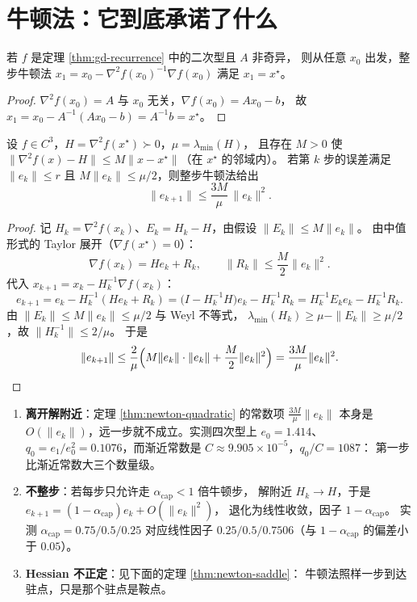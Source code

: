 \section{牛顿法：它到底承诺了什么}

\begin{theorem}[二次型上一步到驻点]
\label{thm:newton-one-step}
若 $f$ 是定理 \ref{thm:gd-recurrence} 中的二次型且 $A$ 非奇异，
则从任意 $x_0$ 出发，整步牛顿法 $x_1=x_0-\nabla^2f(x_0)^{-1}\nabla f(x_0)$
满足 $x_1=x^\star$。
\end{theorem}

\begin{proof}
$\nabla^2f(x_0)=A$ 与 $x_0$ 无关，$\nabla f(x_0)=Ax_0-b$，
故 $x_1=x_0-A^{-1}(Ax_0-b)=A^{-1}b=x^\star$。
\end{proof}

\begin{theorem}[局部二次收敛及其常数]
\label{thm:newton-quadratic}
设 $f\in C^3$，$H=\nabla^2f(x^\star)\succ0$，$\mu=\lambda_{\min}(H)$，
且存在 $M>0$ 使 $\|\nabla^2f(x)-H\|\le M\|x-x^\star\|$（在 $x^\star$ 的邻域内）。
若第 $k$ 步的误差满足 $\|e_k\|\le r$ 且 $M\|e_k\|\le\mu/2$，则整步牛顿法给出
\[
  \|e_{k+1}\|\le\frac{3M}{\mu}\,\|e_k\|^2 .
\]
\end{theorem}

\begin{proof}
记 $H_k=\nabla^2f(x_k)$、$E_k=H_k-H$，由假设 $\|E_k\|\le M\|e_k\|$。
由中值形式的 Taylor 展开（$\nabla f(x^\star)=0$）：
\[
  \nabla f(x_k)=He_k+R_k,\qquad \|R_k\|\le\frac M2\|e_k\|^2 .
\]
代入 $x_{k+1}=x_k-H_k^{-1}\nabla f(x_k)$：
\[
  e_{k+1}=e_k-H_k^{-1}(He_k+R_k)
  =\bigl(I-H_k^{-1}H\bigr)e_k-H_k^{-1}R_k
  =H_k^{-1}E_ke_k-H_k^{-1}R_k .
\]
由 $\|E_k\|\le M\|e_k\|\le\mu/2$ 与 Weyl 不等式，
$\lambda_{\min}(H_k)\ge\mu-\|E_k\|\ge\mu/2$，故 $\|H_k^{-1}\|\le2/\mu$。
于是
\[
  \|e_{k+1}\|\le\frac2\mu\Bigl(M\|e_k\|\cdot\|e_k\|+\frac M2\|e_k\|^2\Bigr)
  =\frac{3M}{\mu}\|e_k\|^2 . \qedhere
\]
\end{proof}

\begin{corollary}
\label{cor:newton-degrade}
\begin{enumerate}
  \item \textbf{离开解附近}：定理 \ref{thm:newton-quadratic} 的常数项 $\frac{3M}\mu\|e_k\|$
        本身是 $O(\|e_k\|)$，远一步就不成立。实测四次型上
        $e_0=1.414$、$q_0=e_1/e_0^2=0.1076$，而渐近常数是
        $C\approx9.905\times10^{-5}$，$q_0/C=1087$：
        第一步比渐近常数大三个数量级。
  \item \textbf{不整步}：若每步只允许走 $\alpha_{\text{cap}}<1$ 倍牛顿步，
        解附近 $H_k\to H$，于是 $e_{k+1}=(1-\alpha_{\text{cap}})e_k+O(\|e_k\|^2)$，
        退化为线性收敛，因子 $1-\alpha_{\text{cap}}$。
        实测 $\alpha_{\text{cap}}=0.75/0.5/0.25$ 对应线性因子
        $0.25/0.5/0.7506$（与 $1-\alpha_{\text{cap}}$ 的偏差小于 $0.05$）。
  \item \textbf{Hessian 不正定}：见下面的定理 \ref{thm:newton-saddle}：
        牛顿法照样一步到达驻点，只是那个驻点是鞍点。
\end{enumerate}
\end{corollary}

